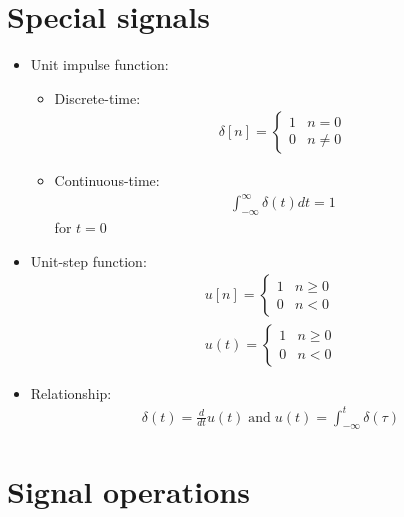 \documentclass[conference]{IEEEtran}
\begin{document}
\section{Special signals}

\begin{itemize}
  \item Unit impulse function:
  \begin{itemize}
    \item Discrete-time:
    \begin{align*}
      \delta[n] = \begin{cases}
        1 & n=0 \\
        0 & n\neq 0
      \end{cases}
    \end{align*}

    \item Continuous-time:
    \begin{align*}
      \int_{-\infty}^\infty \delta(t) dt = 1
    \end{align*}
    for $t=0$
  \end{itemize}

  \item Unit-step function:
  \begin{align*}
    u[n] = \begin{cases}
      1 & n \geq 0 \\
      0 & n < 0
    \end{cases} \\
    u(t) = \begin{cases}
      1 & n \geq 0 \\
      0 & n < 0
    \end{cases} 
  \end{align*}

  \item Relationship:
  \begin{align*}
    \delta(t) = \frac{d}{dt} u(t) \; \text{and} \; u(t) = \int_{-\infty}^t \delta(\tau)
  \end{align*}
\end{itemize}

\pagebreak
\section{Signal operations}
\end{document}
